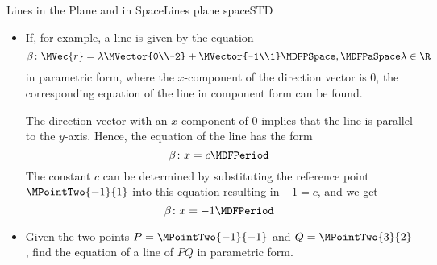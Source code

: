 \begin{MXContent}{Lines in the Plane and in Space}{Lines plane space}{STD}
\begin{MExample}
\begin{itemize}
  The direction vector $\MVector{-3\\2}$ gives the slope $m=\frac{2}{-3}=-\frac{2}{3}$. Thus, the 
  equation of the line in normal form is
 \[
  \alpha\colon y=-\frac{2}{3}x+b \MDFPeriod
 \]
  The reference vector of $\alpha$ is $\MVector{1\\1}$. The reference point $\MPointTwo{1}{1}$ 
  can be substituted into the equation of the line to determine the $y$-intercept:
 \[
  1=-\frac{2}{3}\cdot1+b\MDFPSpace\Leftrightarrow\MDFPSpace b=\frac{5}{3}\MDFPeriod
 \]
  Thus, we have
 \[
  \alpha\colon y=-\frac{2}{3}x+\frac{5}{3} \MDFPeriod
 \]
 \item If, for example, a line is given by the equation
 \[
  \beta\colon \MVec{r}=\lambda\MVector{0\\-2} + \MVector{-1\\1}\MDFPSpace,\MDFPaSpace \lambda\in\R 
 \]
  in parametric form, where the $x$-component of the direction vector is $0$, the corresponding 
  equation of the line in component form can be found. 
 
  The direction vector with an $x$-component of $0$ implies that the line is parallel to the $y$-axis. Hence, 
  the equation of the line has the form 
 \[
  \beta\colon x=c \MDFPeriod
 \]
  The constant $c$ can be determined by substituting the reference point $\MPointTwo{-1}{1}$ into this equation resulting in 
  $-1=c$, and we get
 \[
  \beta\colon x=-1 \MDFPeriod
 \]
 \item Given the two points $P=\MPointTwo{-1}{-1}$ and $Q=\MPointTwo{3}{2}$, find the 
  equation of a line of $P Q$ in parametric form.


\end{itemize}
\end{MExample}
\end{MXContent}
